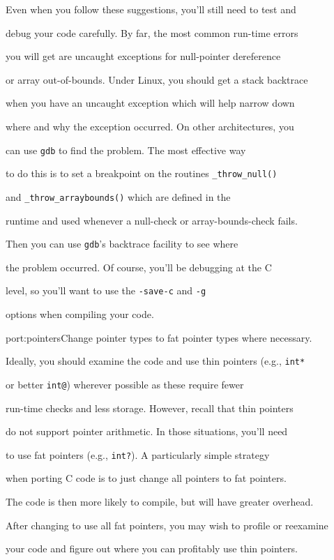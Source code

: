 Even when you follow these suggestions, you'll still need to test and


debug your code carefully.  By far, the most common run-time errors


you will get are uncaught exceptions for null-pointer dereference


or array out-of-bounds.  Under Linux, you should get a stack backtrace


when you have an uncaught exception which will help narrow down


where and why the exception occurred.  On other architectures, you


can use \texttt{gdb} to find the problem.  The most effective way


to do this is to set a breakpoint on the routines \texttt{\_throw\_null()}


and \texttt{\_throw\_arraybounds()} which are defined in the


runtime and used whenever a null-check or array-bounds-check fails.


Then you can use \texttt{gdb}'s backtrace facility to see where


the problem occurred.  Of course, you'll be debugging at the C


level, so you'll want to use the \texttt{-save-c} and \texttt{-g}


options when compiling your code.  





\begin{porta}


{port:pointers}{Change pointer types to fat pointer types where necessary.}  





Ideally, you should examine the code and use thin pointers (e.g., \texttt{int*}


or better \texttt{int@}) wherever possible as these require fewer


run-time checks and less storage.  However, recall that thin pointers


do not support pointer arithmetic.  In those situations, you'll need


to use fat pointers (e.g., \texttt{int?}).  A particularly simple strategy 


when porting C code is to just change all pointers to fat pointers.


The code is then more likely to compile, but will have greater overhead.


After changing to use all fat pointers, you may wish to profile or reexamine


your code and figure out where you can profitably use thin pointers.


\end{porta}





